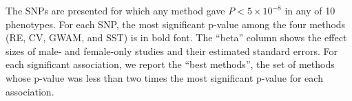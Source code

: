 \documentclass[11pt]{article}
\begin{document}
\begin{table}
{The SNPs are presented for which any method gave $P < 5\times 10^{-8}$ in any of 10 phenotypes.
For each SNP, the most significant p-value among the four methods (RE, CV, GWAM, and SST)
is in bold font. 
The ``beta'' column shows the effect sizes of male- and female-only studies and their estimated standard errors.
For each significant association, we report the ``best methods'', 
the set of methods whose p-value was less than two times the most significant 
p-value for each association.
}
\label{tab:NFBC1}
\end{table}
\end{document}
